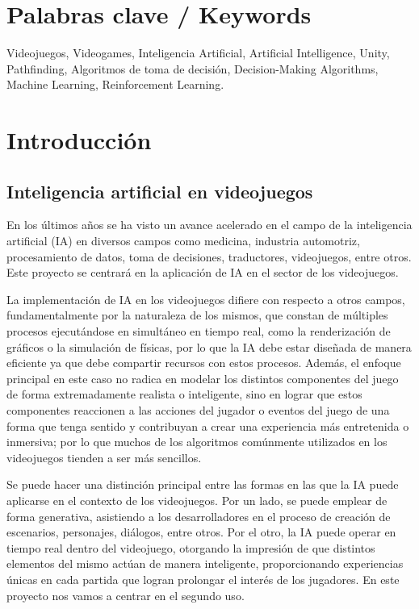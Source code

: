 \documentclass[a4paper]{article}
\begin{document}
\section{Palabras clave / Keywords}

Videojuegos, Videogames, Inteligencia Artificial, Artificial Intelligence, Unity, Pathfinding, Algoritmos de toma de decisión, Decision-Making Algorithms, Machine Learning, Reinforcement Learning.

\section{Introducción}

\subsection{Inteligencia artificial en videojuegos}

En los últimos años se ha visto un avance acelerado en el campo de la inteligencia artificial (IA) en diversos campos como medicina, industria automotriz, procesamiento de datos, toma de decisiones, traductores, videojuegos, entre otros. Este proyecto se centrará en la aplicación de IA en el sector de los videojuegos.

La implementación de IA en los videojuegos difiere con respecto a otros campos, fundamentalmente por la naturaleza de los mismos, que constan de múltiples procesos ejecutándose en simultáneo en tiempo real, como la renderización de gráficos o la simulación de físicas, por lo que la IA debe estar diseñada de manera eficiente ya que debe compartir recursos con estos procesos. Además, el enfoque principal en este caso no radica en modelar los distintos componentes del juego de forma extremadamente realista o inteligente, sino en lograr que estos componentes reaccionen a las acciones del jugador o eventos del juego de una forma que tenga sentido y contribuyan a crear una experiencia más entretenida o inmersiva; por lo que muchos de los algoritmos comúnmente utilizados en los videojuegos tienden a ser más sencillos.

Se puede hacer una distinción principal entre las formas en las que la IA puede aplicarse en el contexto de los videojuegos. Por un lado, se puede emplear de forma generativa, asistiendo a los desarrolladores en el proceso de creación de escenarios, personajes, diálogos, entre otros. Por el otro, la IA puede operar en tiempo real dentro del videojuego, otorgando la impresión de que distintos elementos del mismo actúan de manera inteligente, proporcionando experiencias únicas en cada partida que logran prolongar el interés de los jugadores. En este proyecto nos vamos a centrar en el segundo uso.
\end{document}
